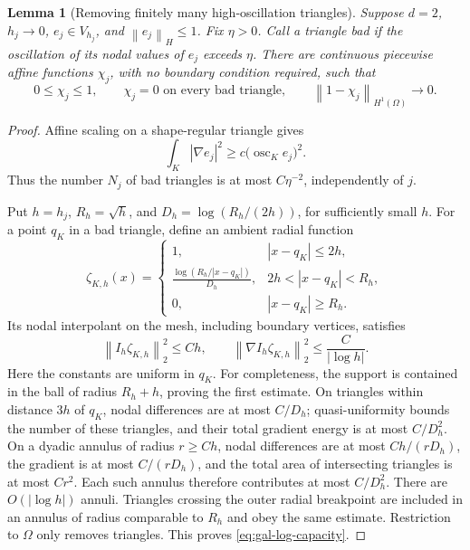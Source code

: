 \documentclass[11pt,a4paper]{article}
\newcommand{\norm}[1]{\left\lVert#1\right\rVert}
\newcommand{\abs}[1]{\left\lvert#1\right\rvert}
\newtheorem{lemma}[theorem]{Lemma}
\theoremstyle{definition}
\theoremstyle{remark}
\numberwithin{equation}{section}
\begin{document}
\begin{lemma}[Removing finitely many high-oscillation triangles]\label{lem:gal-2d-cutoff}
Suppose $d=2$, $h_j\to0$, $e_j\in V_{h_j}$, and $\norm{e_j}_H\le1$. Fix $\eta>0$. Call a triangle bad if the oscillation of its nodal values of $e_j$ exceeds $\eta$. There are continuous piecewise affine functions $\chi_j$, with no boundary condition required, such that
\begin{equation}\label{eq:gal-cutoff-properties}
 0\le\chi_j\le1,\qquad
 \chi_j=0\text{ on every bad triangle},\qquad
 \norm{1-\chi_j}_{H^1(\Omega)}\longrightarrow0.
\end{equation}
\end{lemma}
\begin{proof}
Affine scaling on a shape-regular triangle gives
\[
 \int_K\abs{\nabla e_j}^2\ge c\bigl(\operatorname{osc}_K e_j\bigr)^2.
\]
Thus the number $N_j$ of bad triangles is at most $C\eta^{-2}$, independently of $j$.

Put $h=h_j$, $R_h=\sqrt h$, and $D_h=\log(R_h/(2h))$, for sufficiently small $h$. For a point $q_K$ in a bad triangle, define an ambient radial function
\[
 \zeta_{K,h}(x)=\begin{cases}
 1,&\abs{x-q_K}\le2h,\\
 \displaystyle\frac{\log(R_h/\abs{x-q_K})}{D_h},
       &2h<\abs{x-q_K}<R_h,\\
 0,&\abs{x-q_K}\ge R_h.
 \end{cases}
\]
Its nodal interpolant on the mesh, including boundary vertices, satisfies
\begin{equation}\label{eq:gal-log-capacity}
 \norm{I_h\zeta_{K,h}}_2^2\le Ch,
 \qquad
 \norm{\nabla I_h\zeta_{K,h}}_2^2\le\frac{C}{\abs{\log h}}.
\end{equation}
Here the constants are uniform in $q_K$. For completeness, the support is contained in the ball of radius $R_h+h$, proving the first estimate. On triangles within distance $3h$ of $q_K$, nodal differences are at most $C/D_h$; quasi-uniformity bounds the number of these triangles, and their total gradient energy is at most $C/D_h^2$. On a dyadic annulus of radius $r\ge Ch$, nodal differences are at most $Ch/(rD_h)$, the gradient is at most $C/(rD_h)$, and the total area of intersecting triangles is at most $Cr^2$. Each such annulus therefore contributes at most $C/D_h^2$. There are $O(\abs{\log h})$ annuli. Triangles crossing the outer radial breakpoint are included in an annulus of radius comparable to $R_h$ and obey the same estimate. Restriction to $\Omega$ only removes triangles. This proves \eqref{eq:gal-log-capacity}.


\end{proof}
\end{document}

